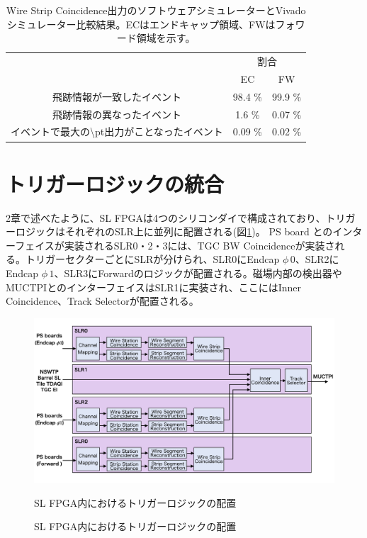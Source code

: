 \begin{table}[]
    \centering
    \caption{Wire Strip Coincidence出力のソフトウェアシミュレーターとVivadoシミュレーター比較結果。ECはエンドキャップ領域、FWはフォワード領域を示す。\cite{mt_kawamoto}}
    \label{tab:Vivado_WS}
    \begin{tabular}{|c|cc|}
    \hline
    \multirow{2}{*}{}                      & \multicolumn{2}{c|}{割合}                \\ \cline{2-3} 
                                           & \multicolumn{1}{c|}{EC}      & FW      \\ \hline\hline
    飛跡情報が一致したイベント                          & \multicolumn{1}{c|}{98.4 \%} & 99.9 \% \\ \hline
    飛跡情報の異なったイベント                          & \multicolumn{1}{c|}{1.6 \%}  & 0.07 \% \\ \hline
    イベントで最大の\textbackslash{}pt出力がことなったイベント & \multicolumn{1}{c|}{0.09 \%} & 0.02 \% \\ \hline
    \end{tabular}
\end{table}



\clearpage
\section{トリガーロジックの統合}
\label{sec_TriggerIntegration}
2章で述べたように、SL FPGAは4つのシリコンダイで構成されており、トリガーロジックはそれぞれのSLR上に並列に配置される(図\ref{Trigger_floor})。
PS board とのインターフェイスが実装されるSLR0・2・3には、TGC BW Coincidenceが実装される。トリガーセクターごとにSLRが分けられ、SLR0にEndcap $\phi\,0$、SLR2にEndcap $\phi\,1$、SLR3にForwardのロジックが配置される。磁場内部の検出器やMUCTPIとのインターフェイスはSLR1に実装され、ここにはInner Coincidence、Track Selectorが配置される。

\begin{figure} 
\centering
\includegraphics[width=16cm]{fig/SL/Trigger_floor.png}
\caption{SL FPGA内におけるトリガーロジックの配置}{SL FPGA内におけるトリガーロジックの配置}
\label{Trigger_floor}
\end{figure}

